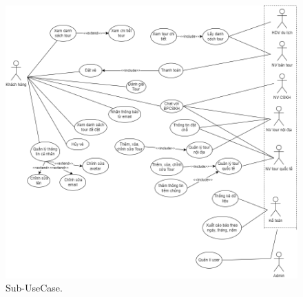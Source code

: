 \begin{figure}[ht]
    \centering
    \includegraphics[width = 1.2\linewidth]{figures/Use Case.png}
    \caption{Sub-UseCase.}
    \label{fig:example_1}
\end{figure}

\vspace{10cm}




